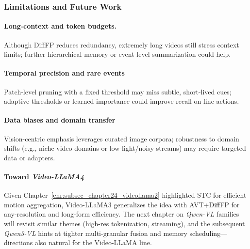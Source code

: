 \begin{enrichment}
\begin{enrichment}
        \subsubsection{Limitations and Future Work}
        \label{subsubsec:chapter24_videollama3_limits}
        \paragraph{Long-context and token budgets.}
        Although DiffFP reduces redundancy, extremely long videos still stress context limits; further hierarchical memory or event-level summarization could help.
        
        \paragraph{Temporal precision and rare events}
        Patch-level pruning with a fixed threshold may miss subtle, short-lived cues; adaptive thresholds or learned importance could improve recall on fine actions.
        
        \paragraph{Data biases and domain transfer}
        Vision-centric emphasis leverages curated image corpora; robustness to domain shifts (e.g., niche video domains or low-light/noisy streams) may require targeted data or adapters.
        
        \paragraph{Toward \emph{Video-LLaMA4}}
        Given Chapter~\ref{enr:subsec_chapter24_videollama2} highlighted STC for efficient motion aggregation, Video-LLaMA3 generalizes the idea with AVT+DiffFP for any-resolution and long-form efficiency. The next chapter on \emph{Qwen-VL} families will revisit similar themes (high-res tokenization, streaming), and the subsequent \emph{Qwen3-VL} hints at tighter multi-granular fusion and memory scheduling—directions also natural for the Video-LLaMA line.
        
    \end{enrichment}
    
    \newpage
    
    \begin{enrichment}
        \label{enr:subsec_chapter24_qwenvl}
        

\end{enrichment}
\end{enrichment}
